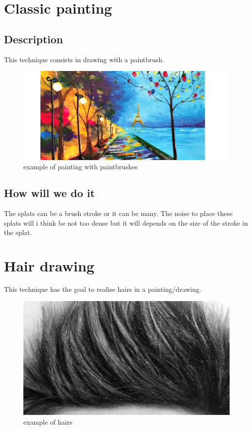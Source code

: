 \documentclass[12pt]{article}
\begin{document}
\section{Classic painting}

\subsection*{Description}

This technique consists in drawing with a paintbrush.

\begin{figure}[!ht]
    \begin{center}
        \includegraphics[scale=0.6]{image/paintbrush.png}
        \caption{example of painting with paintbrushes}
    \end{center}
\end{figure}

\subsection{How will we do it}

The splats can be a brush stroke or it can be many. The noise to place these splats will i think be not too dense but it will depends on the size of the stroke in the splat.

\section{Hair drawing}

This technique has the goal to realise hairs in a painting/drawing.

\begin{figure}[!ht]
    \begin{center}
        \includegraphics[scale=0.3]{image/hairs.jpg}
        \caption{example of hairs}
    \end{center}
\end{figure}
\end{document}
